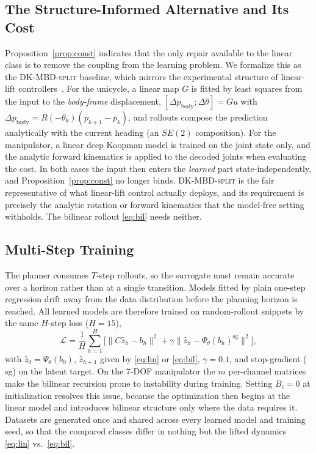 \documentclass[lettersize,journal]{IEEEtran}
\theoremstyle{remark}
\newcommand{\dksplit}{\textsc{DK-MBD-split}}
\begin{document}
\subsection{The Structure-Informed Alternative and Its Cost}\label{subsec:split}

Proposition~\ref{prop:const} indicates that the only repair available
to the linear class is to remove the coupling from the learning
problem. We formalize
this as the \dksplit{} baseline, which mirrors the experimental
structure of linear-lift controllers~\cite{mppidk2026, korda2018mpc}.
For the unicycle, a linear map $G$ is fitted by least squares from the
input to the \emph{body-frame} displacement,
$[\Delta p_{\mathrm{body}}; \Delta\theta] = G u$ with
$\Delta p_{\mathrm{body}} = R(-\theta_k)(p_{k+1} - p_k)$, and rollouts
compose the prediction analytically with the current heading (an
$SE(2)$ composition). For the manipulator, a linear deep Koopman model
is trained on the joint state only, and the analytic forward kinematics
is applied to the decoded joints when evaluating the cost. In both cases the input then
enters the \emph{learned} part state-independently, and
Proposition~\ref{prop:const} no longer binds. \dksplit{} is the fair
representative of what linear-lift control actually deploys, and its
requirement is precisely the analytic rotation or forward kinematics
that the model-free setting withholds. The bilinear rollout
\eqref{eq:bil} needs neither.

\subsection{Multi-Step Training}\label{subsec:training}

The planner consumes $T$-step rollouts, so the surrogate must remain
accurate over a horizon rather than at a single transition. Models
fitted by plain one-step regression drift away from the data
distribution before the planning horizon is reached. All learned models are
therefore trained on random-rollout snippets by the same $H$-step loss
($H = 15$),
\begin{equation}
\mathcal{L} = \frac{1}{H} \sum_{h=1}^{H}
\Big[ \big\| C \hat{z}_h - b_h \big\|^{2}
+ \gamma \big\| \hat{z}_h - \Psi_\theta(b_h)^{\mathrm{sg}} \big\|^{2}
\Big],
\label{eq:loss}
\end{equation}
with $\hat z_0 = \Psi_\theta(b_0)$, $\hat z_{h+1}$ given by
\eqref{eq:lin} or \eqref{eq:bil}, $\gamma = 0.1$, and stop-gradient
($\mathrm{sg}$) on the latent target. On the 7-DOF manipulator the $m$
per-channel matrices make the bilinear recursion prone to instability
during training. Setting $B_i = 0$ at initialization resolves this
issue, because the optimization then begins at the linear model and
introduces bilinear structure only where the data requires it.
Datasets are generated once and shared across every learned model and
training seed, so that the compared classes differ in nothing but the
lifted dynamics \eqref{eq:lin} vs.\ \eqref{eq:bil}.
\end{document}
